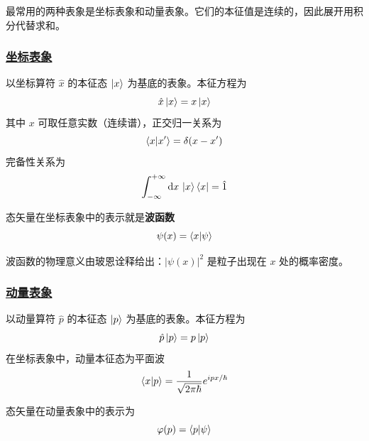 最常用的两种表象是坐标表象和动量表象。它们的本征值是连续的，因此展开用积分代替求和。

\subsubsection{\protect\hyperlink{:}{坐标表象}}

\begin{definition}[坐标表象]
    以坐标算符 $\hat{x}$ 的本征态 $\ket{x}$ 为基底的表象。本征方程为
    \begin{equation}
        \hat{x}\ket{x} = x\ket{x}
    \end{equation}
    其中 $x$ 可取任意实数（连续谱），正交归一关系为
    \begin{equation}
        \braket{x}{x'} = \delta(x - x')
    \end{equation}
    完备性关系为
    \begin{equation}
        \int_{-\infty}^{+\infty}\mathrm{d}x\,\ket{x}\bra{x} = \hat{1}
    \end{equation}
\end{definition}

态矢量在坐标表象中的表示就是\textbf{波函数}
\begin{equation}
    \psi(x) = \braket{x}{\psi}
\end{equation}

波函数的物理意义由玻恩诠释给出：$|\psi(x)|^2$ 是粒子出现在 $x$ 处的概率密度。

\subsubsection{\protect\hyperlink{:}{动量表象}}

\begin{definition}[动量表象]
    以动量算符 $\hat{p}$ 的本征态 $\ket{p}$ 为基底的表象。本征方程为
    \begin{equation}
        \hat{p}\ket{p} = p\ket{p}
    \end{equation}
    在坐标表象中，动量本征态为平面波
    \begin{equation}
        \braket{x}{p} = \frac{1}{\sqrt{2\pi\hbar}}e^{ipx/\hbar}
    \end{equation}
\end{definition}

态矢量在动量表象中的表示为
\begin{equation}
    \varphi(p) = \braket{p}{\psi}
\end{equation}

